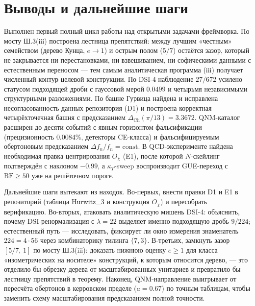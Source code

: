 \documentclass[11pt,a4paper]{article}
\begin{document}
\section{Выводы и дальнейшие шаги}\label{sec:concl}

Выполнен первый полный цикл работы над открытыми задачами фреймворка. По мосту
Ш.3(iii) построена лестница препятствий: между лучшим «честным» семейством
(дерево Кунца, $e \to 1$) и острым полом ($5/7$) остаётся зазор, который не
закрывается ни перестановками, ни взвешиванием, ни софическими данными с
естественным переносом --- тем самым аналитическая программа (iii) получает
численный контур целевой конструкции. По DSI-4 наблюдение $27/672$ усилено
статусом подходящей дроби с гауссовой мерой $0.0499$ и четырьмя независимыми
структурными разложениями. По башне Гурвица найдена и исправлена
несогласованность данных репозитория (D1) и построена корректная четырёхточечная
башня с предсказанием $\Delta_{\mathrm{Ch}}(\pi/13) = 3.3672$. QNM-каталог
расширен до десяти событий с явным горизонтом фальсификации (прецизионность
$0.0084\%$, детекторы CE-класса) и фальсифицируемым обертоновым предсказанием
$\Delta f_n/f_n = \mathrm{const}$. В QCD-эксперименте найдена необходимая
правка центрирования $O_\chi$ (E1), после которой $N$-скейлинг подтверждён с
наклоном $-0.99$, а $\kappa_T$-sweep воспроизводит GUE-переход с
$\mathrm{BF} \ge 50$ уже на решёточном пороге.

Дальнейшие шаги вытекают из находок. Во-первых, внести правки D1 и E1 в
репозиторий (таблица Hurwitz\_3 и конструкция $O_\chi$) и пересобрать
верификацию. Во-вторых, атаковать аналитическую мишень DSI-4: объяснить,
почему DSI-ренормализация с $\lambda = 22$ выделяет именно подходящую дробь
$9/224$; естественный путь --- исследовать, фиксирует ли окно измерения
знаменатель $224 = 4\cdot 56$ через комбинаторику тилинга $\{7,3\}$. В-третьих,
замкнуть зазор $[5/7,\,1]$ по мосту Ш.3(iii): доказать нижнюю оценку $e \ge 1$
для класса «изометрических на носителе» конструкций, к которым относится дерево,
--- это отделило бы обрезку дерева от масштабированных унитариев и превратило
бы лестницу препятствий в теорему. Наконец, QNM-направление выигрывает от
пересчёта обертонов в керровском пределе ($a = 0.67$) по точным таблицам, чтобы
заменить схему масштабирования предсказанием полной точности.

\appendix
\end{document}
